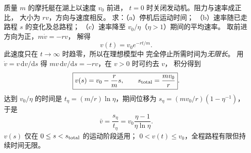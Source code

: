 质量 $m$ 的摩托艇在湖上以速度 $v_0$ 前进，
$t=0$ 时关闭发动机。阻力与速率成正比，
大小为 $rv$，方向与速度相反。
求：（a）停机后运动时间；
（b）速率随已走路程 $s$ 的变化及总路程；
（c）速率降至 $v_0/\eta$（$\eta>1$）期间的平均速率。
\exsolution
取前进方向为正，$m\dot v=-rv$，
解得
\[
\boxed{v(t)=v_0e^{-rt/m}}.
\]
此速度只在 $t\to\infty$ 时趋零，所以在理想模型中
完全停止所需时间为\emph{无限长}。
用 $\dot v=v\,\mathrm dv/\mathrm ds$ 得
$m v\,\mathrm dv/\mathrm ds=-rv$，在 $v>0$ 时可约去 $v$，
积分得到
\[
\boxed{v(s)=v_0-\frac rm s,\qquad
s_{\rm total}=\frac{mv_0}{r}}.
\]
达到 $v_0/\eta$ 的时间是
$t_\eta=(m/r)\ln\eta$，期间位移为
$s_\eta=(mv_0/r)(1-\eta^{-1})$，于是
\[
\boxed{\bar v=\frac{s_\eta}{t_\eta}
=v_0\frac{\eta-1}{\eta\ln\eta}}.
\]
\excheck $v(s)$ 仅在 $0\le s<s_{\rm total}$ 的运动阶段适用；
$0<v(t)\le v_0$，全程路程有限但持续时间无限。
